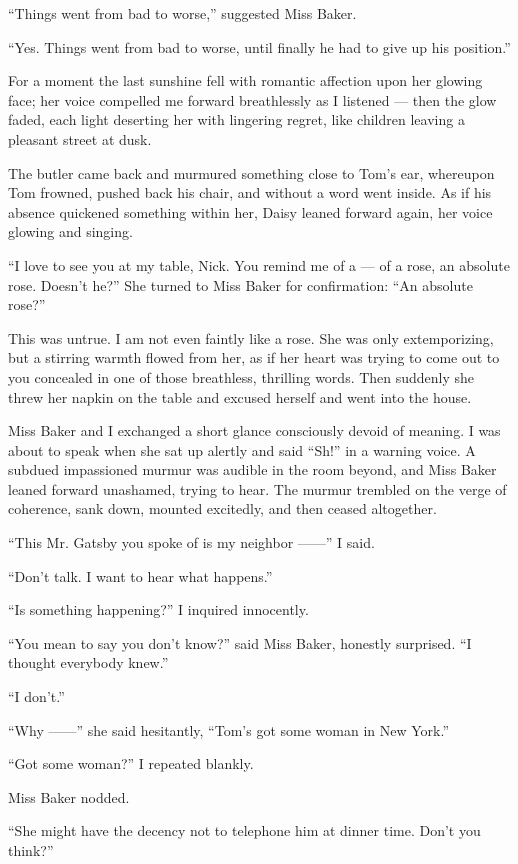 \documentclass{znotebook}
\begin{document}
``Things went from bad to worse,'' suggested Miss Baker.

``Yes. Things went from bad to worse, until finally he had to give up his position.''

For a moment the last sunshine fell with romantic affection upon her glowing face; her voice compelled me forward breathlessly as I listened — then the glow faded, each light deserting her with lingering regret, like children leaving a pleasant street at dusk.

The butler came back and murmured something close to Tom’s ear, whereupon Tom frowned, pushed back his chair, and without a word went inside. As if his absence quickened something within her, Daisy leaned forward again, her voice glowing and singing.

``I love to see you at my table, Nick. You remind me of a — of a rose, an absolute rose. Doesn’t he?'' She turned to Miss Baker for confirmation: ``An absolute rose?''

This was untrue. I am not even faintly like a rose. She was only extemporizing, but a stirring warmth flowed from her, as if her heart was trying to come out to you concealed in one of those breathless, thrilling words. Then suddenly she threw her napkin on the table and excused herself and went into the house.

Miss Baker and I exchanged a short glance consciously devoid of meaning. I was about to speak when she sat up alertly and said ``Sh!'' in a warning voice. A subdued impassioned murmur was audible in the room beyond, and Miss Baker leaned forward unashamed, trying to hear. The murmur trembled on the verge of coherence, sank down, mounted excitedly, and then ceased altogether.

``This Mr. Gatsby you spoke of is my neighbor ——'' I said.

``Don’t talk. I want to hear what happens.''

``Is something happening?'' I inquired innocently.

``You mean to say you don’t know?'' said Miss Baker, honestly surprised. ``I thought everybody knew.''

``I don’t.''

``Why ——'' she said hesitantly, ``Tom’s got some woman in New York.''

``Got some woman?'' I repeated blankly.

Miss Baker nodded.

``She might have the decency not to telephone him at dinner time. Don’t you think?''
\end{document}
